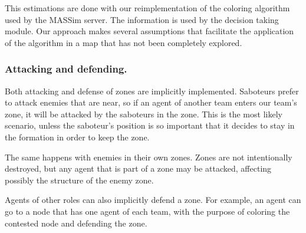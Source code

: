 \documentclass{llncs2e/llncs}
\begin{document}
    This estimations are done with our reimplementation of the coloring
    algorithm used by the MASSim server. The information is used by the decision
    taking module.  Our approach makes several assumptions that facilitate the
    application of the algorithm in a map that has not been completely explored.
    
    
    
    
    


\subsubsection{Attacking and defending.}
    
    Both attacking and defense of zones are implicitly implemented. 
    Saboteurs prefer to attack enemies that are near, so if an agent of another 
    team enters our team's zone, it will be attacked by the saboteurs in the zone.
    This is the most likely scenario, unless the saboteur's position is so 
    important that it decides to stay in the formation in order to keep the zone.

    The same happens with enemies in their own zones. Zones are not intentionally 
    destroyed, but any agent that is part of a zone may be attacked, affecting 
    possibly the structure of the enemy zone.
    
    Agents of other roles can also implicitly defend a zone. For example, an agent 
    can go to a node that has one agent of each team, with the purpose of coloring the 
    contested node and defending the zone.
\end{document}
